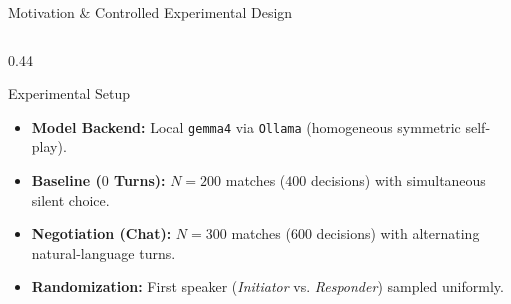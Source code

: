 \documentclass[aspectratio=169, 10pt]{beamer}
\begin{document}
\begin{frame}{Motivation \& Controlled Experimental Design}
\begin{columns}[T, totalwidth=\textwidth]
\begin{column}{0.44\textwidth}
\begin{alertblock}{Experimental Setup}
\begin{itemize}
                    \item \textbf{Model Backend:} Local \texttt{gemma4} via \texttt{Ollama} (homogeneous symmetric self-play).
                    \item \textbf{Baseline ($0$ Turns):} $N = 200$ matches ($400$ decisions) with simultaneous silent choice.
                    \item \textbf{Negotiation (Chat):} $N = 300$ matches ($600$ decisions) with alternating natural-language turns.
                    \item \textbf{Randomization:} First speaker (\emph{Initiator} vs. \emph{Responder}) sampled uniformly.
                \end{itemize}
            \end{alertblock}
        \end{column}
    \end{columns}
\end{frame}
\end{document}
